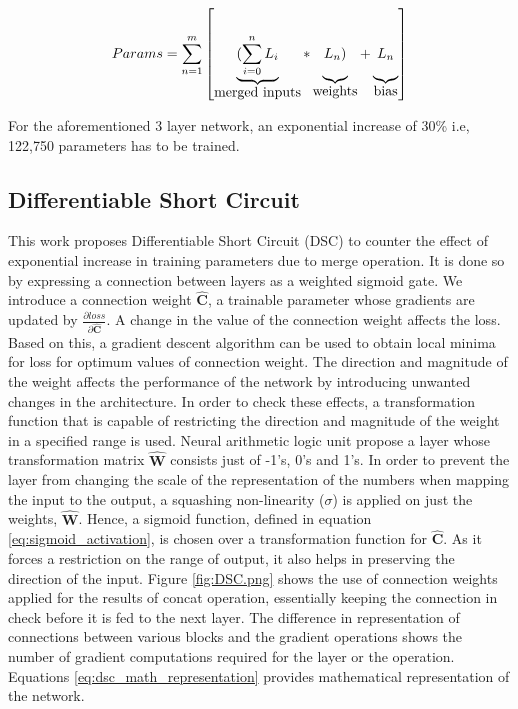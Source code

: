 \documentclass{article}
\let\oldhat\hat
\renewcommand{\hat}[1]{\oldhat{\mathbf{#1}}}
\begin{document}
\begin{equation}
\label{eq:gsc_params}
Params= \sum_{n=1}^{m}\left[
\underbrace{(\sum_{i=0}^{n}L_{i}\rule[-12pt]{0pt}{5pt}}_{\mbox{merged inputs}}
*\underbrace{L_{n})\rule[-12pt]{0pt}{5pt}}_{\mbox{weights}}
+\underbrace{L_{n}\rule[-12pt]{0pt}{5pt}}_{\mbox{bias}}\right]
\end{equation}

For the aforementioned 3 layer network, an exponential increase of 30\% i.e, 122,750 parameters has to be trained.

\subsection{Differentiable Short Circuit}
This work proposes Differentiable Short Circuit (DSC) to counter the effect of exponential increase in training parameters due to merge operation. It is done so by expressing a connection between layers as a weighted sigmoid gate. We introduce a connection weight $\hat{C}$, a trainable parameter whose gradients are updated by $\frac{\partial loss}{\partial \hat{C}}$. A change in the value of the connection weight affects the loss. Based on this, a gradient descent algorithm can be used to obtain local minima for loss for optimum values of connection weight. The direction and magnitude of the weight affects the performance of the network by introducing unwanted changes in the architecture. In order to check these effects, a transformation function that is capable of restricting the direction and magnitude of the weight in a specified range is used. Neural arithmetic logic unit \cite{Trask2018NeuralAL} propose a layer whose transformation matrix $\hat{W}$ consists just of -1's, 0's and 1's. In order to prevent the layer from changing the scale of the representation of the numbers when mapping the input to the output, a squashing non-linearity ($\sigma$) is applied on just the weights, $\hat{W}$.  Hence, a sigmoid function, defined in equation \ref{eq:sigmoid_activation}, is chosen over a transformation function for $\hat{C}$. As it forces a restriction on the range of output, it also helps in preserving the direction of the input. Figure \ref{fig:DSC.png} shows the use of connection weights applied for the results of concat operation, essentially keeping the connection in check before it is fed to the next layer. The difference in representation of connections between various blocks and the gradient operations shows the number of gradient computations required for the layer or the operation. Equations \ref{eq:dsc_math_representation} provides mathematical representation of the network.
\end{document}
